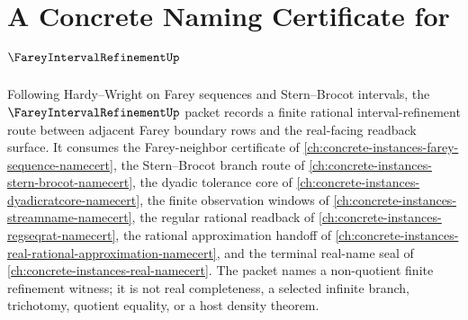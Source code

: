 \chapter{A Concrete Naming Certificate for $\FareyIntervalRefinementUp$}
\label{ch:concrete-instances-farey-interval-refinement-namecert}

Following Hardy--Wright on Farey sequences and Stern--Brocot intervals, the $\FareyIntervalRefinementUp$ packet records a finite rational interval-refinement route between adjacent Farey boundary rows and the real-facing readback surface. It consumes the Farey-neighbor certificate of \autoref{ch:concrete-instances-farey-sequence-namecert}, the Stern--Brocot branch route of \autoref{ch:concrete-instances-stern-brocot-namecert}, the dyadic tolerance core of \autoref{ch:concrete-instances-dyadicratcore-namecert}, the finite observation windows of \autoref{ch:concrete-instances-streamname-namecert}, the regular rational readback of \autoref{ch:concrete-instances-regseqrat-namecert}, the rational approximation handoff of \autoref{ch:concrete-instances-real-rational-approximation-namecert}, and the terminal real-name seal of \autoref{ch:concrete-instances-real-namecert}. The packet names a non-quotient finite refinement witness; it is not real completeness, a selected infinite branch, trichotomy, quotient equality, or a host density theorem.

